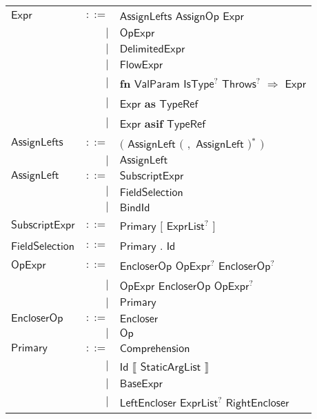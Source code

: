  
\begin{longtable}[l]{p{3cm}rl}
$\mathsf{Expr}$ &  $\mathsf{::=}$  & $\mathsf{AssignLefts}$ $\mathsf{AssignOp}$ $\mathsf{Expr}$ \\
 & $\big|$ &  $\mathsf{OpExpr}$ \\
 & $\big|$ &  $\mathsf{DelimitedExpr}$ \\
 & $\big|$ &  $\mathsf{FlowExpr}$ \\
 & $\big|$ &  $\mathbf{fn}$ $\mathsf{ValParam}$ $\mathsf{IsType}$$^?$ $\mathsf{Throws}$$^?$ $\mathbf{\Rightarrow}$ $\mathsf{Expr}$ \\
 & $\big|$ &  $\mathsf{Expr}$ $\mathbf{as}$ $\mathsf{TypeRef}$ \\
 & $\big|$ &  $\mathsf{Expr}$ $\mathbf{asif}$ $\mathsf{TypeRef}$ \\
$\mathsf{AssignLefts}$ &  $\mathsf{::=}$  & $\big($  $\mathsf{AssignLeft}$ $\big($  $\mathbf{,}$ $\mathsf{AssignLeft}$ $\big)$$^*$ $\big)$ \\
 & $\big|$ &  $\mathsf{AssignLeft}$ \\
$\mathsf{AssignLeft}$ &  $\mathsf{::=}$  & $\mathsf{SubscriptExpr}$ \\
 & $\big|$ &  $\mathsf{FieldSelection}$ \\
 & $\big|$ &  $\mathsf{BindId}$ \\
$\mathsf{SubscriptExpr}$ &  $\mathsf{::=}$  & $\mathsf{Primary}$ $\mathbf{[}$ $\mathsf{ExprList}$$^?$ $\mathbf{]}$ \\
$\mathsf{FieldSelection}$ &  $\mathsf{::=}$  & $\mathsf{Primary}$ $\mathbf{.}$ $\mathsf{Id}$ \\
$\mathsf{OpExpr}$ &  $\mathsf{::=}$  & $\mathsf{EncloserOp}$ $\mathsf{OpExpr}$$^?$ $\mathsf{EncloserOp}$$^?$ \\
 & $\big|$ &  $\mathsf{OpExpr}$ $\mathsf{EncloserOp}$ $\mathsf{OpExpr}$$^?$ \\
 & $\big|$ &  $\mathsf{Primary}$ \\
$\mathsf{EncloserOp}$ &  $\mathsf{::=}$  & $\mathsf{Encloser}$ \\
 & $\big|$ &  $\mathsf{Op}$ \\
$\mathsf{Primary}$ &  $\mathsf{::=}$  & $\mathsf{Comprehension}$ \\
 & $\big|$ &  $\mathsf{Id}$ $\mathbf{\llbracket}$ $\mathsf{StaticArgList}$ $\mathbf{\rrbracket}$ \\
 & $\big|$ &  $\mathsf{BaseExpr}$ \\
 & $\big|$ &  $\mathsf{LeftEncloser}$ $\mathsf{ExprList}$$^?$ $\mathsf{RightEncloser}$ \\

\end{longtable}
